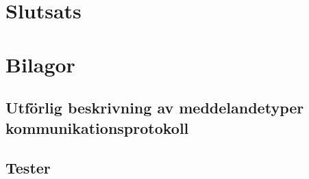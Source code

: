 \documentclass{article}
\begin{document}
\section{Slutsats}





\section{Bilagor}
    \subsection{Utförlig beskrivning av meddelandetyper kommunikationsprotokoll}
    \label{bilaga:protokoll}
        
        
	\subsection{Tester}
    		\label{bilaga:tester}
\end{document}
